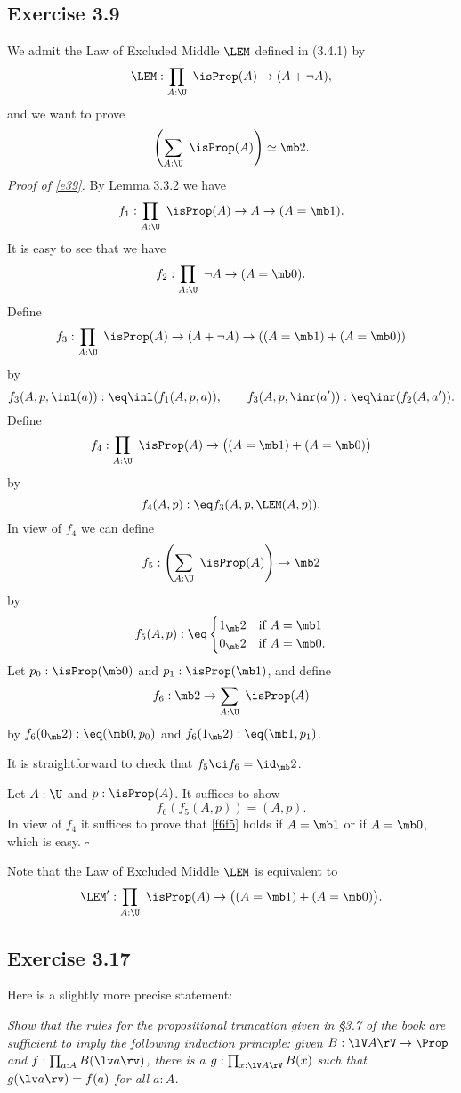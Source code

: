 \documentclass[12pt]{article}
\begin{document}
\subsection{Exercise 3.9}

We admit the Law of Excluded Middle $\LEM$ defined in (3.4.1) by 
$$
\LEM:\prod_{A:\U}\ \isProp(A)\to(A+\neg A),
$$ 
and we want to prove 
\begin{equation}\label{e39}
\left(\sum_{A:\U}\ \isProp(A)\right)\simeq\mb2.
\end{equation}
\emph{Proof of \eqref{e39}.} By Lemma 3.3.2 we have 
$$
f_1:\prod_{A:\U}\ \isProp(A)\to A\to(A=\mb1). 
$$ 
It is easy to see that we have 
$$
f_2:\prod_{A:\U}\ \neg A\to(A=\mb0). 
$$ 
Define 
$$
f_3:\prod_{A:\U}\ \isProp(A)\to(A+\neg A)\to((A=\mb1)+(A=\mb0))
$$ 
by 
$$
f_3(A,p,\inl(a)):\eq\inl(f_1(A,p,a)),\qquad f_3(A,p,\inr(a')):\eq\inr(f_2(A,a')).
$$ 
Define 
$$
f_4:\prod_{A:\U}\ \isProp(A)\to\big((A=\mb1)+(A=\mb0)\big)
$$ 
by 
$$
f_4(A,p):\eq f_3(A,p,\LEM(A,p)).
$$ 
In view of $f_4$ we can define 
$$
f_5:\left(\sum_{A:\U}\ \isProp(A)\right)\to\mb2
$$ 
by 
$$
f_5(A,p):\eq
\begin{cases}
1_\mb2&\text{if }A=\mb1\\
0_\mb2&\text{if }A=\mb0.
\end{cases}
$$ 
Let $p_0:\isProp(\mb0)$ and $p_1:\isProp(\mb1)$, and define 
$$
f_6:\mb2\to\sum_{A:\U}\ \isProp(A)
$$ 
by $f_6(0_\mb2):\eq(\mb0,p_0)$ and $f_6(1_\mb2):\eq(\mb1,p_1)$.

It is straightforward to check that $f_5\ci f_6=\id_\mb2$. 

Let $A:\U$ and $p:\isProp(A)$. It suffices to show 
\begin{equation}\label{f6f5}
f_6(f_5(A,p))=(A,p).
\end{equation}
In view of $f_4$ it suffices to prove that \eqref{f6f5} holds if $A=\mb1$ or if $A=\mb0$, which is easy. $\square$ 

Note that the Law of Excluded Middle $\LEM$ is equivalent to 
$$
\LEM':\prod_{A:\U}\ \isProp(A)\to\big((A=\mb1)+(A=\mb0)\big).
$$ 


\subsection{Exercise 3.17}%

Here is a slightly more precise statement:

\emph{Show that the rules for the propositional truncation given in \S3.7 of the book are sufficient to imply the following induction principle: given $B:\lV A\rV\to\Prop$ and $f:\prod_{a:A}B(\lv a\rv)$, there is a $g:\prod_{x:\lV A\rV}B(x)$ such that $g(\lv a\rv)=f(a)$ for all $a:A$.}
\end{document}
